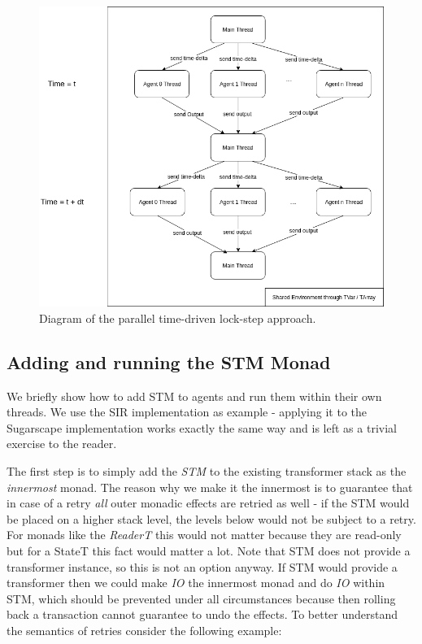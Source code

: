 \begin{figure}
	\centering
	\includegraphics[width=1.0\textwidth, angle=0]{./fig/concurrentabs/stm_abs.png}
	\caption{Diagram of the parallel time-driven lock-step approach.}
	\label{fig:stm_abs_structure}
\end{figure}

\subsection{Adding and running the STM Monad}
We briefly show how to add STM to agents and run them within their own threads. We use the SIR implementation as example - applying it to the Sugarscape implementation works exactly the same way and is left as a trivial exercise to the reader.

The first step is to simply add the \textit{STM} to the existing transformer stack as the \textit{innermost} monad. The reason why we make it the innermost is to guarantee that in case of a retry \textit{all} outer monadic effects are retried as well - if the STM would be placed on a higher stack level, the levels below would not be subject to a retry. For monads like the \textit{ReaderT} this would not matter because they are read-only but for a StateT this fact would matter a lot. Note that STM does not provide a transformer instance, so this is not an option anyway. If STM would provide a transformer then we could make \textit{IO} the innermost monad and do \textit{IO} within STM, which should be prevented under all circumstances because then rolling back a transaction cannot guarantee to undo the effects. To better understand the semantics of retries consider the following example:

